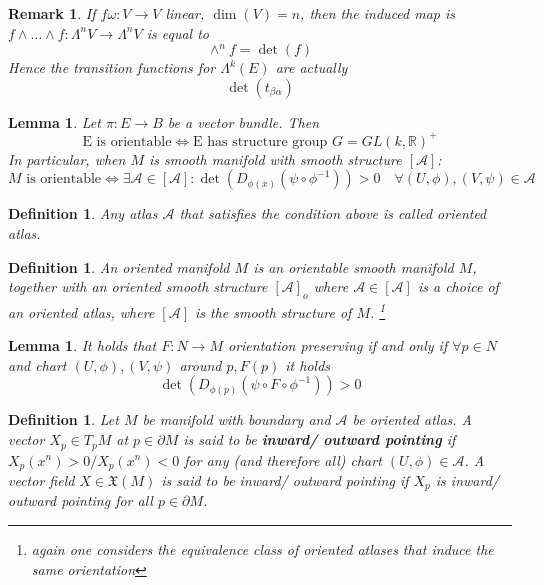 \documentclass{article}
\numberwithin{theorem}{section}
\newtheorem{lemma}[theorem]{Lemma}
\newtheorem{definition}[theorem]{Definition}
\newtheorem*{remark}{Remark}
\newcommand{\R}{\mathbb{R}}
\newcommand{\1}{\mathds{1}}
\begin{document}
\begin{remark}
    If $f\omega: V \to V$ linear, $\dim(V)=n$, then the induced map is $f \wedge \dots \wedge f : \Lambda^nV \to \Lambda^n V $ is equal to 
    \[ \wedge^n f = \det(f) \]
    Hence the transition functions for $\Lambda^k(E)$ are actually 
    \[ \det(t_{\beta \alpha}) \]
\end{remark}

\begin{lemma}\label{orientation_lemma}
    Let $\pi: E \to B$ be a vector bundle. Then 
    \[ \text{E is orientable} \Leftrightarrow  \text{E has structure group } G = GL(k, \R)^+ \]
    In particular, when $M$ is smooth manifold with smooth structure $[\mathcal{A}]$:  
    \[ M \text{ is orientable} \Leftrightarrow \exists \mathcal{A} \in [\mathcal{A}]: \det(D_{\phi(x)}(\psi \circ\phi^{-1})) > 0 \quad \forall  (U, \phi), (V, \psi) \in \mathcal{A}  \]
\end{lemma}
\begin{definition}
    Any atlas $\mathcal{A}$ that satisfies the condition above is called oriented atlas. 
\end{definition}
\begin{definition}
    An oriented manifold $M$ is an orientable smooth manifold $M$, together with an oriented smooth structure $[\mathcal{A}]_{o}$ where  $\mathcal{A} \in [\mathcal{A}]$ is a choice of an oriented atlas, where $[\mathcal{A}]$ is the smooth structure of $M$. \footnote{again one considers the equivalence class of oriented atlases that induce the same orientation} 
\end{definition}

\iffalse 
\begin{definition}
    Let $F: N \to M$ be local diffeomorphism of orientable manifolds and $\nu_{\pm}, \omega_{\pm}$ their respective orientations. $F$ is said to be orientation preserving if 
    \[ F^* \omega_{\pm} = \nu_{\pm}\]
    and orientation reversing if 
    \[ F^* \omega_{\pm} = \nu_{\mp}\]
\end{definition}
\fi 

\begin{lemma}
    It holds that $F: N \to M $ orientation preserving if and only if $\forall p \in N$ and chart $(U,\phi), (V, \psi)$ around $p, F(p)$ it holds 
    \[  \det\left( D_{\phi(p)}(\psi \circ F \circ \phi^{-1}) \right)  > 0  \] 
\end{lemma}

\begin{definition}
    Let $M$ be manifold with boundary and $\mathcal{A}$ be oriented atlas. A vector $X_p \in T_pM$ at $p \in \partial M$ is said to be \textbf{inward/ outward pointing} if $X_p(x^n) > 0 / X_p(x^n) < 0 $ for any (and therefore all) chart $(U, \phi) \in \mathcal{A}$. A vector field $X \in \mathfrak{X}(M) $ is said to be inward/ outward pointing if $X_p$ is inward/ outward pointing for all $p \in \partial M$. 
\end{definition}
\end{document}
